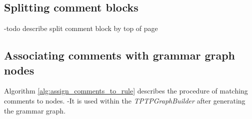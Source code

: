 \subsection{Splitting comment blocks}\label{sec:ImplementationMaintainingCommentsSplitByTOP}

-todo describe split comment block by top of page

\subsection{Associating comments with grammar graph nodes}\label{sec:ImplementationMaintainingCommentsAssociateWithNodes}

Algorithm \ref{alg:assign_comments_to_rule} describes the procedure of matching comments to nodes.
-It is used within the \textit{TPTPGraphBuilder} after generating the grammar graph.

